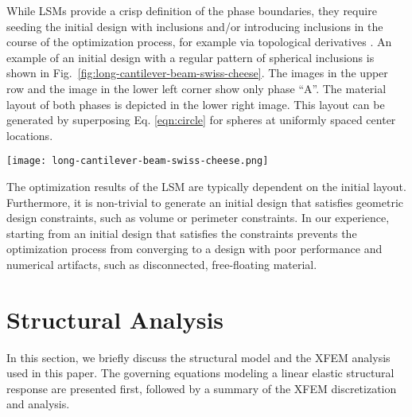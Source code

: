 While LSMs provide a crisp definition of the phase boundaries, they require seeding the initial design with inclusions and/or introducing inclusions in the course of the optimization process, for example via topological derivatives \citep{EKS:94,SZ:99,BHR:04,NBH+:07}. An example of an initial design with a regular pattern of spherical inclusions is shown in Fig.~\ref{fig:long-cantilever-beam-swiss-cheese}. The images in the upper row and	the image in the lower left corner show only phase ``A''. The material layout of both phases is depicted in the lower right image. This layout can be generated by superposing Eq. \ref{eqn:circle} for spheres at uniformly spaced center locations.
%
\begin{figure*}
	\texttt{[image: long-cantilever-beam-swiss-cheese.png]}
	\caption{Initial design with array of spherical inclusions for the cantilever beam example of Section \ref{sec:two-phase-optimization}; blue represents phase ``A" material and red represents phase``B".}
	\label{fig:long-cantilever-beam-swiss-cheese}
\end{figure*}
%
The optimization results of the LSM are typically dependent on the initial layout. Furthermore, it is non-trivial to generate an initial design that satisfies geometric design constraints, such as volume or perimeter constraints. In our experience, starting from an initial design that satisfies the constraints prevents the optimization process from converging to a design with poor performance and numerical artifacts, such as disconnected, free-floating material.


\section{Structural Analysis}
\label{sec:structural-analysis}

In this section, we briefly discuss the structural model and the XFEM analysis used in this paper. The governing equations modeling a linear elastic structural response are presented first, followed by a summary of the XFEM discretization and analysis.


